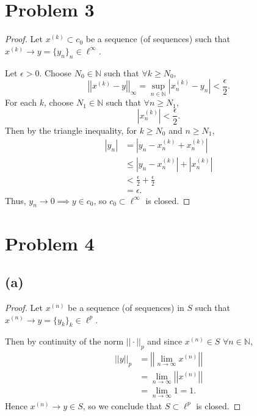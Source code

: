 \documentclass{article}
\begin{document}
\section*{Problem 3}
\begin{proof}
	Let $x^{(k)}\subset c_0$ be a sequence (of sequences) such that \\ $x^{(k)}\rightarrow y=\{y_n\}_n \in \ell^{\infty}$. 
	
	Let $\epsilon > 0$. Choose $N_0 \in \mathbb{N}$ such that $\forall k \geq N_0$, 
	\begin{equation}
		\left|\left|x^{(k)} - y\right|\right|_{\infty} = \sup\limits_{n\in\mathbb{N}} \left|x_n^{(k)}-y_n\right| < \frac{\epsilon}{2}.
	\end{equation}
	For each $k$, choose $N_1\in\mathbb{N}$ such that $\forall n \geq N_1$, 
	\begin{equation}
		\left|x_n^{(k)}\right| < \frac{\epsilon}{2}.
	\end{equation}
	Then by the triangle inequality, for $k\geq N_0$ and $n\geq N_1$, 
	\begin{align}
		|y_n| &= \left|y_n - x_n^{(k)} + x_n^{(k)}\right| \\
		& \leq \left|y_n - x_n^{(k)}\right| + \left|x_n^{(k)}\right| \\
		&< \frac{\epsilon}{2} + \frac{\epsilon}{2} \\
		&= \epsilon.
	\end{align}
	Thus, $y_n \rightarrow 0 \implies y \in c_0$, so $c_0 \subset \ell^{\infty}$ is closed.
\end{proof}

\section*{Problem 4}
\subsection*{(a)}
\begin{proof}
	Let $x^{(n)}$ be a sequence (of sequences) in $S$ such that \\$x^{(n)} \rightarrow y = \{y_k\}_k \in \ell^p$. 
	
	Then by continuity of the norm $||\cdot||_p$ and since $x^{(n)} \in S$ $\forall n\in\mathbb{N}$, 
	\begin{align}
		||y||_p &= \left|\left|\lim_{n \to \infty} x^{(n)}\right|\right| \\
		&= \lim_{n \to \infty} \left|\left|x^{(n)}\right|\right| \\
		&= \lim_{n \to \infty} 1 = 1. 
	\end{align}
	Hence $x^{(n)} \rightarrow y \in S$, so we conclude that $S\subset \ell^p$ is closed.
\end{proof}
\end{document}
